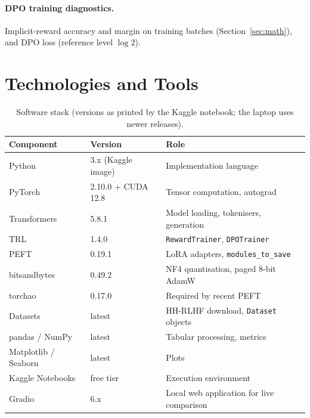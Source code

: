 \paragraph{DPO training diagnostics.} Implicit-reward accuracy and margin on training batches (Section~\ref{sec:math}), and DPO loss (reference level $\log 2$).

\section{Technologies and Tools}
\label{sec:tools}

\begin{table}[!htbp]
\centering
\caption[Software stack]{Software stack (versions as printed by the Kaggle notebook; the laptop uses newer releases).}
\label{tab:software}
\small
\begin{tabularx}{\textwidth}{@{}L{2.9cm}L{3.2cm}Y@{}}
\toprule
\textbf{Component} & \textbf{Version} & \textbf{Role}\\
\midrule
Python & 3.x (Kaggle image) & Implementation language\\
PyTorch~\cite{paszke2019pytorch} & 2.10.0 + CUDA 12.8 & Tensor computation, autograd\\
Transformers~\cite{wolf2020transformers} & 5.8.1 & Model loading, tokenisers, generation\\
TRL~\cite{vonwerra2020trl} & 1.4.0 & \texttt{RewardTrainer}, \texttt{DPOTrainer}\\
PEFT~\cite{mangrulkar2022peft} & 0.19.1 & LoRA adapters, \texttt{modules\_to\_save}\\
bitsandbytes & 0.49.2 & NF4 quantisation, paged 8-bit AdamW\\
torchao & 0.17.0 & Required by recent PEFT\\
Datasets & latest & HH-RLHF download, \texttt{Dataset} objects\\
pandas / NumPy & latest & Tabular processing, metrics\\
Matplotlib / Seaborn & latest & Plots\\
Kaggle Notebooks & free tier & Execution environment\\
Gradio & 6.x & Local web application for live comparison\\
\bottomrule
\end{tabularx}
\end{table}

